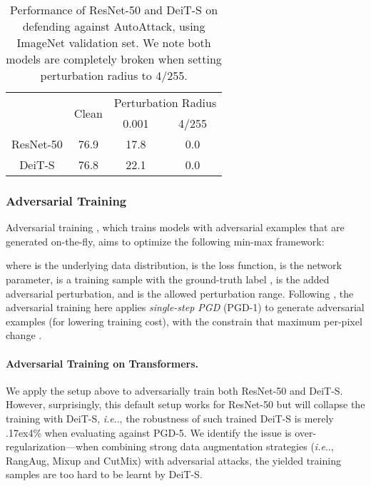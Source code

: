 \documentclass{article}
\makeatletter
\newcommand{\app}{\raise.17ex\hbox{}}
\DeclareRobustCommand\onedot{\futurelet\@let@token\@onedot}
\def\@onedot{\ifx\@let@token.\else.\null\fi\xspace}
\def\ie{\emph{i.e}\onedot} \def\Ie{\emph{I.e}\onedot}
\makeatother
\begin{document}
\begin{table}[h!]
\caption{Performance of ResNet-50 and DeiT-S on defending against AutoAttack, using ImageNet validation set. We note both models are completely broken  when setting perturbation radius to 4/255.}
\centering
\footnotesize
\begin{tabular}{c|c|c|c}
\shline
                     & \multirow{2}{*}{Clean}                & \multicolumn{2}{c}{Perturbation Radius}                                              \\ \cline{3-4}
                     &                   & 0.001                &   4/255                   \\ \shline
ResNet-50            &     76.9                 &      17.8                &      0.0                                  \\ DeiT-S     &  76.8   &           22.1            &                     0.0            \\ \hline
\end{tabular}
\label{fig:cleanautoattack}
\end{table}



\subsubsection{Adversarial Training} 
Adversarial training \cite{Goodfellow2015,Madry2018}, which trains models with adversarial examples that are generated on-the-fly, aims to optimize the following min-max framework:

where  is the underlying data distribution,   is the loss function,  is the network parameter,  is a training sample with the ground-truth label ,  is the added adversarial perturbation, and  is the allowed perturbation range.  Following \cite{Xie2019a,wong2020fast}, the adversarial training here applies \emph{single-step PGD} (PGD-1) to generate adversarial examples (for lowering training cost), with the constrain that maximum per-pixel change .

\paragraph{Adversarial Training on Transformers.} We apply the setup above to adversarially train both ResNet-50 and DeiT-S. However, surprisingly, this default setup works for ResNet-50 but will collapse the training with DeiT-S, \ie, the robustness of such trained DeiT-S is merely \app4\% when evaluating against PGD-5. We identify the issue is over-regularization---when combining strong data augmentation strategies (\ie, RangAug, Mixup and CutMix) with adversarial attacks, the yielded training samples are too hard to be learnt by DeiT-S. 
\end{document}
